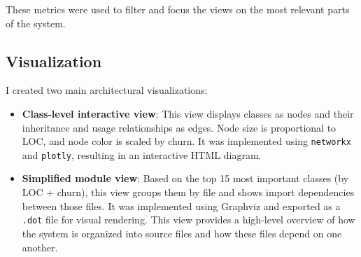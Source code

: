 These metrics were used to filter and focus the views on the most relevant parts of the system.

\subsection{Visualization}

I created two main architectural visualizations:

\begin{itemize}
  \item \textbf{Class-level interactive view}: This view displays classes as nodes and their inheritance and usage relationships as edges. Node size is proportional to LOC, and node color is scaled by churn. It was implemented using \texttt{networkx} and \texttt{plotly}, resulting in an interactive HTML diagram.

  \item \textbf{Simplified module view}: Based on the top 15 most important classes (by LOC + churn), this view groups them by file and shows import dependencies between those files. It was implemented using Graphviz and exported as a \texttt{.dot} file for visual rendering. This view provides a high-level overview of how the system is organized into source files and how these files depend on one another.
\end{itemize}
